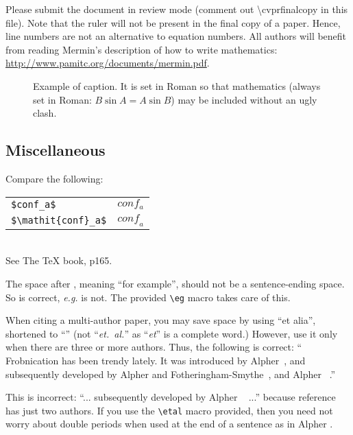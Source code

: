 \documentclass[10pt,twocolumn,letterpaper]{article}
\begin{document}
Please submit the document in review mode (comment out \textbackslash cvprfinalcopy in this file). Note that the ruler will not be present in the final copy of a paper. Hence, line numbers are not an alternative to equation numbers.  All authors will benefit from reading
Mermin's description of how to write mathematics:
\url{http://www.pamitc.org/documents/mermin.pdf}.

\begin{figure}[t]
\begin{center}
\fbox{\rule{0pt}{2in} \rule{0.9\linewidth}{0pt}}
\end{center}
   \caption{Example of caption.  It is set in Roman so that mathematics
   (always set in Roman: $B \sin A = A \sin B$) may be included without an
   ugly clash.}
\label{fig:long}
\label{fig:onecol}
\end{figure}

\subsection{Miscellaneous}

\noindent
Compare the following:\\
\begin{tabular}{ll}
 \verb'$conf_a$' &  $conf_a$ \\
 \verb'$\mathit{conf}_a$' & $\mathit{conf}_a$\\
\end{tabular}\\
See The TeX book, p165.

The space after \eg, meaning ``for example'', should not be a
sentence-ending space. So \eg is correct, {\em e.g.} is not.  The provided
\verb'\eg' macro takes care of this.

When citing a multi-author paper, you may save space by using ``et alia'',
shortened to ``\etal'' (not ``{\em et.\ al.}'' as ``{\em et}'' is a complete word.)
However, use it only when there are three or more authors.  Thus, the
following is correct: ``
   Frobnication has been trendy lately.
   It was introduced by Alpher~\cite{Alpher02}, and subsequently developed by
   Alpher and Fotheringham-Smythe~\cite{Alpher03}, and Alpher \etal~\cite{Alpher04}.''

This is incorrect: ``... subsequently developed by Alpher \etal~\cite{Alpher03} ...''
because reference~\cite{Alpher03} has just two authors.  If you use the
\verb'\etal' macro provided, then you need not worry about double periods
when used at the end of a sentence as in Alpher \etal.
\end{document}
